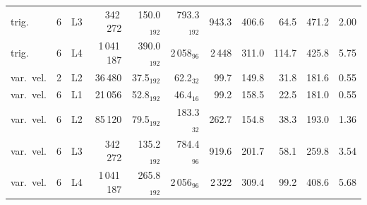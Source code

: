 \begin{tabular}{lrlrrrrrrrr}
trig. & 6 & L3 & 342\,272 & 150.0$_{192}$ & 793.3$_{192}$ & 943.3 & 406.6 & 64.5 & 471.2 & 2.00\\
trig. & 6 & L4 & 1\,041\,187 & 390.0$_{192}$ & 2\,058$_{96}$ & 2\,448 & 311.0 & 114.7 & 425.8 & 5.75\\
var.\ vel. & 2 & L2 & 36\,480 & 37.5$_{192}$ & 62.2$_{32}$ & 99.7 & 149.8 & 31.8 & 181.6 & 0.55\\
var.\ vel. & 6 & L1 & 21\,056 & 52.8$_{192}$ & 46.4$_{16}$ & 99.2 & 158.5 & 22.5 & 181.0 & 0.55\\
var.\ vel. & 6 & L2 & 85\,120 & 79.5$_{192}$ & 183.3$_{32}$ & 262.7 & 154.8 & 38.3 & 193.0 & 1.36\\
var.\ vel. & 6 & L3 & 342\,272 & 135.2$_{192}$ & 784.4$_{96}$ & 919.6 & 201.7 & 58.1 & 259.8 & 3.54\\
var.\ vel. & 6 & L4 & 1\,041\,187 & 265.8$_{192}$ & 2\,056$_{96}$ & 2\,322 & 309.4 & 99.2 & 408.6 & 5.68\\
\bottomrule
\end{tabular}
